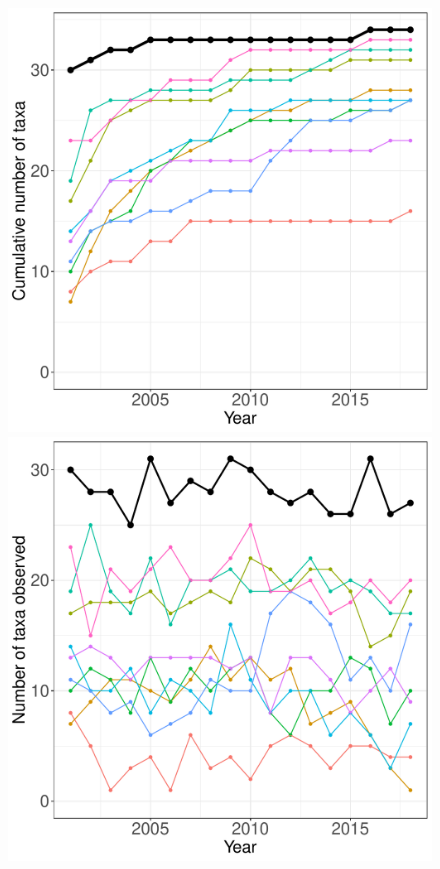 \documentclass[11pt, oneside]{article}
\begin{document}
\begin{figure}[h!]
\centering
\includegraphics[scale = 0.4]{sbc-mobileInverts-castorani_species_accumulation_curve.pdf}
\includegraphics[scale = 0.4]{sbc-mobileInverts-castorani_num_taxa_over_time.pdf}

\end{figure}
\end{document}
